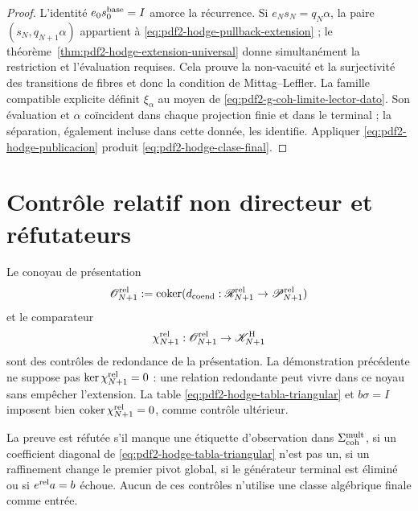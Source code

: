 \begin{proof}
L'identité $e_0s_0^{\rm base}=I$ amorce la récurrence. Si
$e_Ns_N=q_N\alpha$, la paire $(s_N,q_{N+1}\alpha)$ appartient à
\eqref{eq:pdf2-hodge-pullback-extension} ; le
théorème~\ref{thm:pdf2-hodge-extension-universal} donne simultanément la restriction
et l'évaluation requises. Cela prouve la non-vacuité et la surjectivité des
transitions de fibres et donc la condition de Mittag--Leffler. La
famille compatible explicite définit $\xi_\alpha$ au moyen de
\eqref{eq:pdf2-g-coh-limite-lector-dato}. Son évaluation et $\alpha$
coïncident dans chaque projection finie et dans le terminal ; la séparation, également
incluse dans cette donnée, les identifie. Appliquer
\eqref{eq:pdf2-hodge-publicacion} produit
\eqref{eq:pdf2-hodge-clase-final}.
\end{proof}

\section{Contrôle relatif non directeur et réfutateurs}

Le conoyau de présentation
\begin{equation}\label{eq:pdf2-hodge-o-rel}
 \mathscr O_{N+1}^{\rm rel}:=\operatorname{coker}
 (d_{\rm coend}:\mathscr R_{N+1}^{\rm rel}\to
                  \mathscr P_{N+1}^{\rm rel})
\end{equation}
et le comparateur
\begin{equation}\label{eq:pdf2-hodge-chi-rel}
 \chi_{N+1}^{\rm rel}:\mathscr O_{N+1}^{\rm rel}\to
 \mathscr K^{\rm H}_{N+1}
\end{equation}
sont des contrôles de redondance de la présentation. La démonstration précédente
ne suppose pas $\ker\chi_{N+1}^{\rm rel}=0$ : une relation redondante peut vivre
dans ce noyau sans empêcher l'extension. La table
\eqref{eq:pdf2-hodge-tabla-triangular} et
$b\sigma=I$ imposent bien
$\operatorname{coker}\chi_{N+1}^{\rm rel}=0$, comme contrôle ultérieur.

\begin{falsifier}
La preuve est réfutée s'il manque une étiquette d'observation dans
$\Sigma_{\rm coh}^{\rm mult}$, si un coefficient diagonal de
\eqref{eq:pdf2-hodge-tabla-triangular} n'est pas un, si un raffinement change
le premier pivot global, si le générateur terminal est éliminé ou si
$e^{\rm rel}a=b$ échoue. Aucun de ces contrôles n'utilise une classe algébrique
finale comme entrée.
\end{falsifier}

